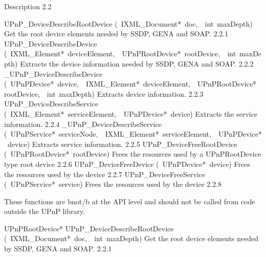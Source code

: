 \documentclass{article}
\begin{document}
\begin{cxxentry}
\begin{cxxentry}
\begin{cxxfunction}
\begin{cxxdoc}
\end{cxxdoc}
\end{cxxfunction}
\end{cxxentry}
\begin{cxxentry}
{}
        {Description}
        {}
        {}
        {2.2}
\begin{cxxnames}
        {UPnP\_DeviceDescribeRootDevice}
        {(\ IXML\_Document*\ doc,\ \ int\ maxDepth)}
        {Get the root device elements needed by SSDP, GENA and SOAP.}
        {2.2.1}
        {UPnP\_DeviceDescribeDevice}
        {(\ IXML\_Element*\ deviceElement,\ \ UPnPRootDevice*\ rootDevice,\ \ int\ maxDepth)}
        {Extracts the device information needed by SSDP, GENA and SOAP.}
        {2.2.2}
        {\_UPnP\_DeviceDescribeDevice}
        {(\ UPnPDevice*\ device,\ \ IXML\_Element*\ deviceElement,\ \ UPnPRootDevice*\ rootDevice,\ \ int\ maxDepth)}
        {Extracts device information.}
        {2.2.3}
        {UPnP\_DeviceDescribeService}
        {(\ IXML\_Element*\ serviceElement,\ \ UPnPDevice*\ device)}
        {Extracts the service information.}
        {2.2.4}
        {\_UPnP\_DeviceDescribeService}
        {(\ UPnPService*\ serviceNode,\ \ IXML\_Element*\ serviceElement,\ \ UPnPDevice*\ device)}
        {Extracts service information.}
        {2.2.5}
        {UPnP\_DeviceFreeRootDevice}
        {(\ UPnPRootDevice*\ rootDevice)}
        {Frees the resources used by a UPnPRootDevice type root device}
        {2.2.6}
        {UPnP\_DeviceFreeDevice}
        {(\ UPnPDevice*\ device)}
        {Frees the resources used by the device}
        {2.2.7}
        {UPnP\_DeviceFreeService}
        {(\ UPnPService*\ service)}
        {Frees the resources used by the device}
        {2.2.8}
\end{cxxnames}
\begin{cxxdoc}
These functions are \<b\>not\</b\> at the API level and should not be called from
code outside the UPnP library. 
\end{cxxdoc}
\begin{cxxfunction}
{UPnPRootDevice*}
        {UPnP\_DeviceDescribeRootDevice}
        {(\ IXML\_Document*\ doc,\ \ int\ maxDepth)}
        {Get the root device elements needed by SSDP, GENA and SOAP.}
        {2.2.1}
\end{cxxfunction}
\end{cxxentry}
\end{cxxentry}
\end{document}
